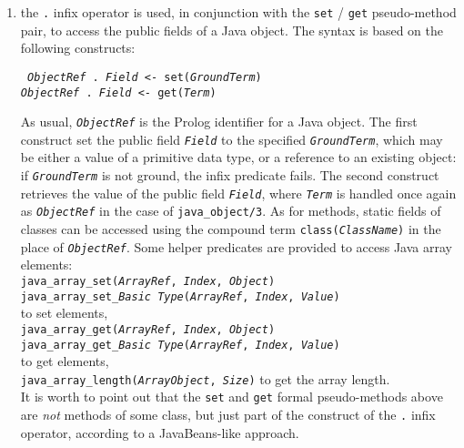 \begin{enumerate}
  \item the \texttt{.} infix operator is used, in conjunction with the \texttt{set}
        / \texttt{get} pseudo-method pair, to access the public fields of a Java
        object.
        The syntax is based on the following constructs:
        \begin{center}
        \tt
        \textit{ObjectRef} . \textit{Field} <- set(\textit{GroundTerm})\\
        \textit{ObjectRef} . \textit{Field} <- get(\textit{Term})\\
        \end{center}
        As usual, \texttt{\textit{ObjectRef}} is the Prolog identifier for
        a Java object.
        The first construct set the public field \texttt{\textit{Field}}
        to the specified \texttt{\textit{GroundTerm}}, which may be either
        a value of a primitive data type, or a reference to an existing
        object: if \texttt{\textit{GroundTerm}} is not ground, the infix
        predicate fails.
        The second construct retrieves the value of the public field
        \texttt{\textit{Field}}, where \texttt{\textit{Term}} is handled
        once again as \texttt{\textit{ObjectRef}} in the case of
        \texttt{java\_object/3}.
        As for methods, static fields of classes can be accessed using the compound
        term \texttt{class(\textit{ClassName})} in the place
        of \texttt{\textit{ObjectRef}}.
        Some helper predicates are provided to access Java array
        elements:\\
        \texttt{java\_array\_set(\textit{ArrayRef}, \textit{Index}, \textit{Object})}\\
        \texttt{java\_array\_set\_\textit{\emph{Basic Type}}(\textit{ArrayRef}, \textit{Index}, \textit{Value})}\\
        to set elements,\\
        \texttt{java\_array\_get(\textit{ArrayRef}, \textit{Index}, \textit{Object})}\\
        \texttt{java\_array\_get\_\textit{\emph{Basic Type}}(\textit{ArrayRef}, \textit{Index}, \textit{Value})}\\
        to get elements,\\
        \texttt{java\_array\_length(\textit{ArrayObject}, \textit{Size})}
        to get the array length.\\
        It is worth to point out that the \texttt{set} and \texttt{get} formal
        pseudo-methods above are \textit{not} methods of some class, but just
        part of the construct of the \texttt{.} infix operator, according to
        a JavaBeans-like approach.


\end{enumerate}
